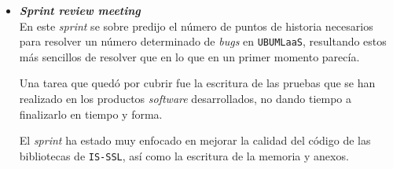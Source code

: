 \begin{itemize}
\item \textbf{\textit{Sprint review meeting}}\\
En este \textit{sprint} se sobre predijo el número de puntos de historia necesarios para resolver un número determinado de \textit{bugs} en \texttt{UBUMLaaS}, resultando estos más sencillos de resolver que en lo que en un primer momento parecía. 

Una tarea que quedó por cubrir fue la escritura de las pruebas que se han realizado en los productos \textit{software} desarrollados, no dando tiempo a finalizarlo en tiempo y forma.

El \textit{sprint} ha estado muy enfocado en mejorar la calidad del código de las bibliotecas de \texttt{IS-SSL}, así como la escritura de la memoria y anexos.

\end{itemize}

